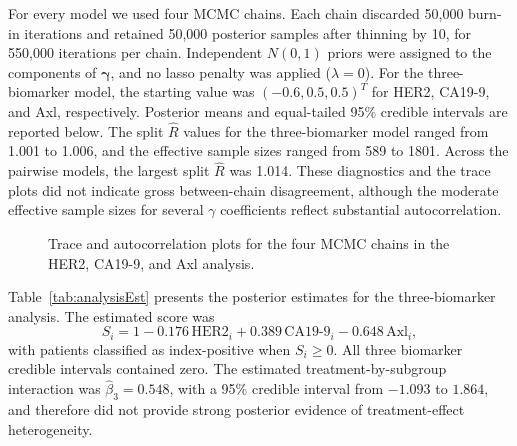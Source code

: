For every model we used four MCMC chains. Each chain discarded 50,000 burn-in
iterations and retained 50,000 posterior samples after thinning by 10, for
550,000 iterations per chain. Independent $N(0,1)$ priors were assigned to
the components of $\boldsymbol\gamma$, and no lasso penalty was applied
($\lambda=0$). For the three-biomarker model, the starting value was
$(-0.6,0.5,0.5)^{T}$ for HER2, CA19-9, and Axl, respectively. Posterior means
and equal-tailed 95\% credible intervals are reported below. The split
$\widehat R$ values for the three-biomarker model ranged from 1.001 to 1.006,
and the effective sample sizes ranged from 589 to 1801. Across the pairwise
models, the largest split $\widehat R$ was 1.014. These diagnostics and the
trace plots did not indicate gross between-chain disagreement, although the
moderate effective sample sizes for several $\gamma$ coefficients reflect
substantial autocorrelation.

\begin{figure}[!htbp]
\centering
{}
\caption[MCMC diagnostics for the three-biomarker model]{Trace and
autocorrelation plots for the four MCMC chains in the HER2, CA19-9, and Axl
analysis.}
\label{fig:analysisConvergence}
\end{figure}

Table~\ref{tab:analysisEst} presents the posterior estimates for the
three-biomarker analysis. The estimated score was
\begin{equation}
\label{eq:threeBiomarkerScore}
    S_i
    = 1 - 0.176\,\mathrm{HER2}_i
        + 0.389\,\mathrm{CA19\mbox{-}9}_i
        - 0.648\,\mathrm{Axl}_i,
\end{equation}
with patients classified as index-positive when $S_i\geq0$. All three
biomarker credible intervals contained zero. The estimated
treatment-by-subgroup interaction was $\hat\beta_3=0.548$, with a 95\%
credible interval from $-1.093$ to $1.864$, and therefore did not provide
strong posterior evidence of treatment-effect heterogeneity.

